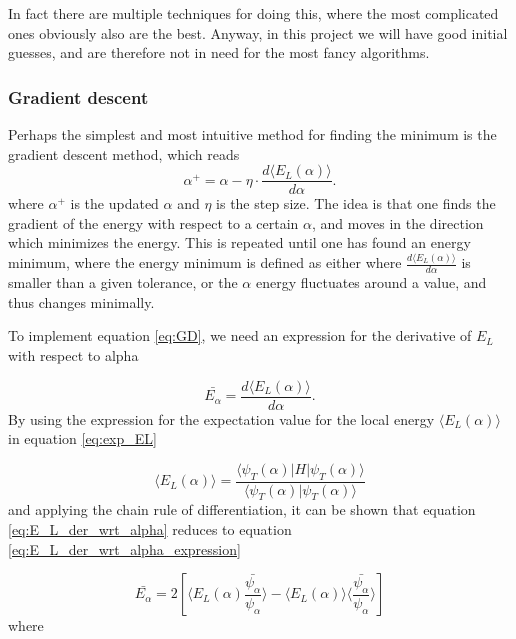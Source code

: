 \documentclass[norsk,a4paper,12pt]{article}
\begin{document}
In fact there are multiple techniques for doing this, where the most complicated ones obviously also are the best. Anyway, in this project we will have good initial guesses, and are therefore not in need for the most fancy algorithms. 

\subsubsection{Gradient descent}
Perhaps the simplest and most intuitive method for finding the minimum is the gradient descent method, which reads
\begin{equation}
\label{eq:GD}
\alpha^+=\alpha - \eta\cdot\frac{d\langle E_L(\alpha)\rangle}{d\alpha}.
\end{equation}
where $\alpha^+$ is the updated $\alpha$ and $\eta$ is the step size. The idea is that one finds the gradient of the energy with respect to a certain $\alpha$, and moves in the direction which minimizes the energy. This is repeated until one has found an energy minimum, where the energy minimum is defined as either where $\frac{d\langle E_L(\alpha)\rangle}{d\alpha}$ is smaller than a given tolerance, or the $\alpha$ energy fluctuates around a value, and thus changes minimally.
\par 
\vspace{3mm}

To implement equation \ref{eq:GD}, we need an expression for the derivative of $E_L$ with respect to alpha

\begin{equation}
	\label{eq:E_L_der_wrt_alpha}
	\bar{E_{\alpha}} = \frac{d \langle E_L (\alpha) \rangle}{d \alpha}.
\end{equation}
By using the expression for the expectation value for the local energy $ \langle E_L (\alpha) \rangle$ in equation \ref{eq:exp_EL} 

\begin{equation}
	\label{eq:exp_EL}
	\langle E_L (\alpha) \rangle = \frac{ \langle \psi_T(\alpha) | H | \psi_T(\alpha)  \rangle}{ \langle \psi_T(\alpha)  |  \psi_T(\alpha)  \rangle }
\end{equation}
and applying the chain rule of differentiation, it can be shown that equation \ref{eq:E_L_der_wrt_alpha} reduces to equation \ref{eq:E_L_der_wrt_alpha_expression}

\begin{equation}
	\label{eq:E_L_der_wrt_alpha_expression}
	\bar{E_{\alpha}} = 2 [\langle E_L (\alpha)  \frac{ \bar{\psi_{\alpha}}}{\psi_{\alpha}}\rangle - \langle E_L (\alpha) \rangle \langle \frac{\bar{\psi_{\alpha}}}{\psi_{\alpha}} \rangle ]
\end{equation}
where
\end{document}
